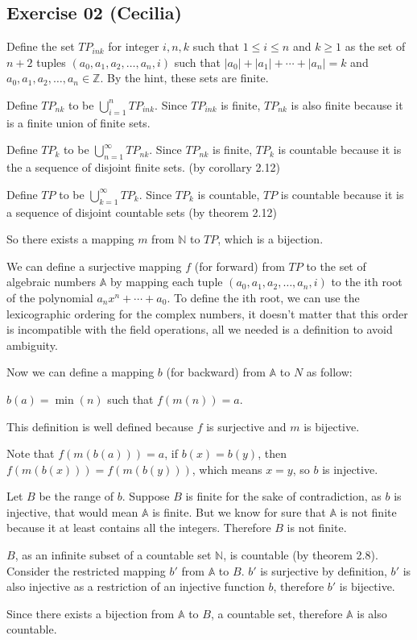 \subsection*{Exercise 02 (Cecilia)}
Define the set $ TP_{ink} $ for integer $ i, n, k $ such that $ 1 \leq i \leq n $ and $ k \ge 1 $ as the set of $ n + 2 $ tuples $ (a_0, a_1, a_2, \dots, a_n, i) $ such that $ |a_0| + |a_1| + \cdots + |a_n| = k $ and $ a_0, a_1, a_2, \dots, a_n \in \mathbb{Z} $. By the hint, these sets are finite.

Define $ TP_{nk} $ to be $ \bigcup\limits_{i=1}^n TP_{ink} $. Since $ TP_{ink} $ is finite, $ TP_{nk} $ is also finite because it is a finite union of finite sets.

Define $ TP_k $ to be $ \bigcup\limits_{n=1}^\infty TP_{nk} $. Since $ TP_{nk} $ is finite, $ TP_k $ is countable because it is the a sequence of disjoint finite sets. (by corollary 2.12)

Define $ TP $ to be $ \bigcup\limits_{k=1}^\infty TP_k $. Since $ TP_k $ is countable, $ TP $ is countable because it is a sequence of disjoint countable sets (by theorem 2.12)

So there exists a mapping $ m $ from $ \mathbb{N} $ to $ TP $, which is a bijection.

We can define a surjective mapping $ f $ (for forward) from $ TP $ to the set of algebraic numbers $ \mathbb{A} $ by mapping each tuple $ (a_0, a_1, a_2, \dots, a_n, i) $ to the ith root of the polynomial $ a_nx^n + \cdots + a_0 $. To define the ith root, we can use the lexicographic ordering for the complex numbers, it doesn't matter that this order is incompatible with the field operations, all we needed is a definition to avoid ambiguity.

Now we can define a mapping $ b $ (for backward) from $ \mathbb{A} $ to $ N $ as follow:

$ b(a) = \min(n) $  such that $ f(m(n)) = a $.

This definition is well defined because $ f $ is surjective and $ m $ is bijective.

Note that $ f(m(b(a))) = a $, if $ b(x) = b(y) $, then $ f(m(b(x))) = f(m(b(y))) $, which means $ x = y $, so $ b $ is injective.

Let $ B $ be the range of $ b $. Suppose $ B $ is finite for the sake of contradiction, as $ b $ is injective, that would mean $ \mathbb{A} $ is finite. But we know for sure that $ \mathbb{A} $ is not finite because it at least contains all the integers. Therefore $ B $ is not finite.

$ B $, as an infinite subset of a countable set $ \mathbb{N} $, is countable (by theorem 2.8). Consider the restricted mapping $ b' $ from $ \mathbb{A} $ to $ B $. $ b' $ is surjective by definition, $ b' $ is also injective as a restriction of an injective function $ b $, therefore $ b' $ is bijective.

Since there exists a bijection from $ \mathbb{A} $ to $ B $, a countable set, therefore $ \mathbb{A} $ is also countable.